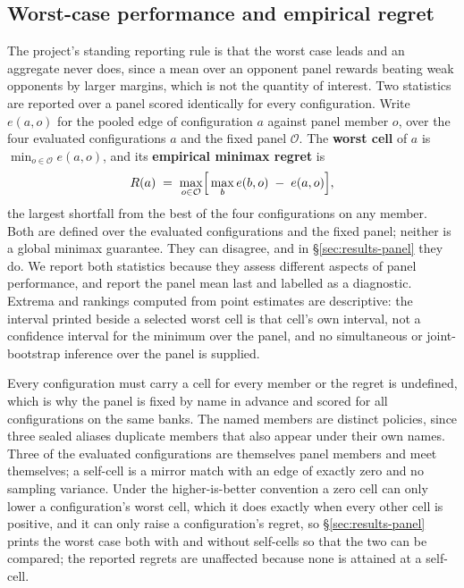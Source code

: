 \subsection{Worst-case performance and empirical regret}
\label{sec:evaluation-panel}

The project's standing reporting rule is that the worst case leads and an aggregate never does, since
a mean over an opponent panel rewards beating weak opponents by larger margins, which is not the
quantity of interest. Two statistics are reported over a panel scored identically for every
configuration. Write $e(a,o)$ for the pooled edge of configuration $a$ against panel member $o$,
over the four evaluated configurations $a$ and the fixed panel $\mathcal{O}$. The \textbf{worst
cell} of $a$ is $\min_{o \in \mathcal{O}} e(a,o)$, and its \textbf{empirical minimax regret} is
\[
  R(a) \;=\; \max_{o \in \mathcal{O}} \Bigl[\, \max_{b} e(b,o) \;-\; e(a,o) \Bigr],
\]
the largest shortfall from the best of the four configurations on any member. Both are defined over
the evaluated configurations and the fixed panel; neither is a global minimax guarantee. They can
disagree, and in \S\ref{sec:results-panel} they do. We report both statistics because they assess
different aspects of panel performance, and report the panel mean last and labelled as a
diagnostic. Extrema and rankings computed from point estimates are descriptive: the interval printed
beside a selected worst cell is that cell's own interval, not a confidence interval for the minimum
over the panel, and no simultaneous or joint-bootstrap inference over the panel is supplied.

Every configuration must carry a cell for every member or the regret is undefined, which is why the
panel is fixed by name in advance and scored for all configurations on the same banks. The
\vsevenPanelMembers{} named members are \vsevenPanelDistinct{} distinct policies, since three
sealed aliases duplicate members that also appear under their own names. Three of the evaluated
configurations are themselves panel members and meet themselves; a self-cell is a mirror match with
an edge of exactly zero and no sampling variance. Under the higher-is-better convention a zero cell
can only lower a configuration's worst cell, which it does exactly when every other cell is
positive, and it can only raise a configuration's regret, so \S\ref{sec:results-panel} prints the
worst case both with and without self-cells so that the two can be compared; the reported regrets
are unaffected because none is attained at a self-cell.
